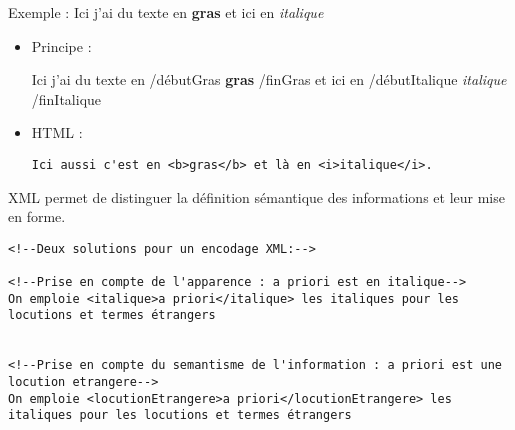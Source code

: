 \documentclass[18pt,a4paper,oneside]{book} %
\begin{document}
Exemple : Ici j'ai du texte en \textbf{gras} et ici en \textit{italique}
\begin{itemize}
\item Principe :

Ici j'ai du texte en /débutGras \textbf{gras} /finGras et ici en /débutItalique \textit{italique} /finItalique

\item HTML :
\lstset{language=HTML}
\begin{lstlisting}
Ici aussi c'est en <b>gras</b> et là en <i>italique</i>.
\end{lstlisting}
\end{itemize}
\bigskip 

XML permet de distinguer la définition sémantique des informations et leur mise en forme.
\lstset{language=XML}
\begin{lstlisting}
<!--Deux solutions pour un encodage XML:-->

<!--Prise en compte de l'apparence : a priori est en italique-->
On emploie <italique>a priori</italique> les italiques pour les locutions et termes étrangers


<!--Prise en compte du semantisme de l'information : a priori est une locution etrangere-->
On emploie <locutionEtrangere>a priori</locutionEtrangere> les italiques pour les locutions et termes étrangers
\end{lstlisting}
\end{document}
